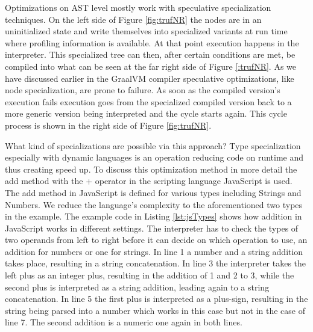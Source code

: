 Optimizations on AST level mostly work with speculative specialization techniques. On the left side of Figure \ref{fig:trufNR} the nodes are in an uninitialized state and write themselves into specialized variants at run time where profiling information is available. \cite{wuerthSelf} At that point execution happens in the interpreter. This specialized tree can then, after certain conditions are met, be compiled into what can be seen at the far right side of Figure \ref{:trufNR}. As we have discussed earlier in the GraalVM compiler speculative optimizations, like node specialization, are prone to failure. As soon as the compiled version's execution fails execution goes from the specialized compiled version back to a more generic version being interpreted and the cycle starts again. This cycle process is shown in the right side of Figure \ref{fig:trufNR}.

What kind of specializations are possible via this approach? Type specialization especially with dynamic languages is an operation reducing code on runtime and thus creating speed up. To discuss this optimization method in more detail the add method with the + operator in the scripting language JavaScript is used. The add method in JavaScript is defined for various types including Strings and Numbers. We reduce the language's complexity to the aforementioned two types in the example. The example code in Listing \ref{lst:jsTypes} shows how addition in JavaScript works in different settings. The interpreter has to check the types of two operands from left to right before it can decide on which operation to use, an addition for numbers or one for strings. In line 1 a number and a string addition takes place, resulting in a string concatenation. In line 3 the interpreter takes the left plus as an integer plus, resulting in the addition of 1 and 2 to 3, while the second plus is interpreted as a string addition, leading again to a string concatenation. In line 5 the first plus is interpreted as a plus-sign, resulting in the string being parsed into a number which works in this case but not in the case of line 7. The second addition is a numeric one again in both lines.

